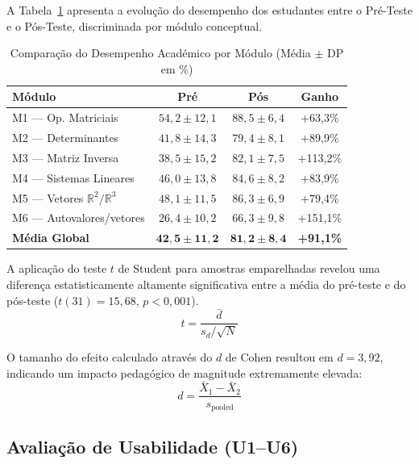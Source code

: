 \documentclass[conference]{IEEEtran}
\begin{document}
A Tabela~\ref{tab:desempenho} apresenta a evolução do desempenho dos estudantes entre o Pré-Teste e o Pós-Teste, discriminada por módulo conceptual.

\begin{table}[htbp]
\caption{Comparação do Desempenho Académico por Módulo (Média $\pm$ DP em \%)}
\label{tab:desempenho}
\centering
\footnotesize
\begin{tabular}{|p{2.3cm}|c|c|c|}
\hline
\textbf{Módulo} & \textbf{Pré} & \textbf{Pós} & \textbf{Ganho} \\
\hline
M1 --- Op. Matriciais & $54{,}2 \pm 12{,}1$ & $88{,}5 \pm 6{,}4$ & +63,3\% \\
\hline
M2 --- Determinantes & $41{,}8 \pm 14{,}3$ & $79{,}4 \pm 8{,}1$ & +89,9\% \\
\hline
M3 --- Matriz Inversa & $38{,}5 \pm 15{,}2$ & $82{,}1 \pm 7{,}5$ & +113,2\% \\
\hline
M4 --- Sistemas Lineares & $46{,}0 \pm 13{,}8$ & $84{,}6 \pm 8{,}2$ & +83,9\% \\
\hline
M5 --- Vetores $\mathbb{R}^2/\mathbb{R}^3$ & $48{,}1 \pm 11{,}5$ & $86{,}3 \pm 6{,}9$ & +79,4\% \\
\hline
M6 --- Autovalores/vetores & $26{,}4 \pm 10{,}2$ & $66{,}3 \pm 9{,}8$ & +151,1\% \\
\hline
\textbf{Média Global} & $\mathbf{42{,}5 \pm 11{,}2}$ & $\mathbf{81{,}2 \pm 8{,}4}$ & \textbf{+91,1\%} \\
\hline
\end{tabular}
\end{table}

A aplicação do teste $t$ de Student para amostras emparelhadas revelou uma diferença estatisticamente altamente significativa entre a média do pré-teste e do pós-teste ($t(31) = 15{,}68$, $p < 0{,}001$).
\begin{equation}
t = \frac{\bar{d}}{s_d / \sqrt{N}}
\label{eq:teste-t}
\end{equation}

O tamanho do efeito calculado através do $d$ de Cohen resultou em $d = 3{,}92$, indicando um impacto pedagógico de magnitude extremamente elevada:
\begin{equation}
d = \frac{\bar{X}_1 - \bar{X}_2}{s_{\text{pooled}}}
\label{eq:cohen}
\end{equation}

\subsection{Avaliação de Usabilidade (U1--U6)}
\end{document}
